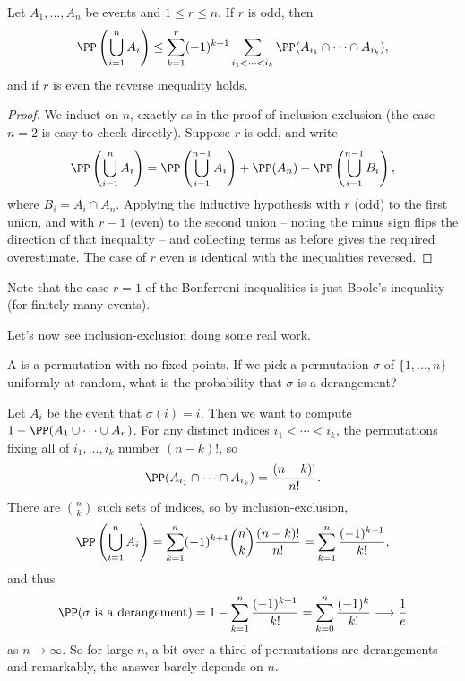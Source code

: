 \begin{theorem}
	Let $A_1, \dots, A_n$ be events and $1 \leq r \leq n$. If $r$ is odd, then
	$$
	\PP\left(\bigcup_{i = 1}^n A_i\right) \leq \sum_{k = 1}^{r} (-1)^{k + 1} \sum_{i_1 < \cdots < i_k} \PP(A_{i_1} \cap \cdots \cap A_{i_k}),
	$$
	and if $r$ is even the reverse inequality holds.
\end{theorem}
\begin{proof}
	We induct on $n$, exactly as in the proof of inclusion-exclusion (the case $n = 2$ is easy to check directly). Suppose $r$ is odd, and write
	$$
	\PP\left(\bigcup_{i = 1}^{n} A_i\right) = \PP\left(\bigcup_{i = 1}^{n-1} A_i\right) + \PP(A_n) - \PP\left(\bigcup_{i = 1}^{n - 1} B_i\right),
	$$
	where $B_i = A_i \cap A_n$. Applying the inductive hypothesis with $r$ (odd) to the first union, and with $r - 1$ (even) to the second union -- noting the minus sign flips the direction of that inequality -- and collecting terms as before gives the required overestimate. The case of $r$ even is identical with the inequalities reversed.
\end{proof}

Note that the case $r = 1$ of the Bonferroni inequalities is just Boole's inequality (for finitely many events).

Let's now see inclusion-exclusion doing some real work.

\begin{example}[Derangements]
	A  is a permutation with no fixed points. If we pick a permutation $\sigma$ of $\{1, \dots, n\}$ uniformly at random, what is the probability that $\sigma$ is a derangement?

	Let $A_i$ be the event that $\sigma(i) = i$. Then we want to compute $1 - \PP(A_1 \cup \cdots \cup A_n)$. For any distinct indices $i_1 < \cdots < i_k$, the permutations fixing all of $i_1, \dots, i_k$ number $(n - k)!$, so
	$$
	\PP(A_{i_1} \cap \cdots \cap A_{i_k}) = \frac{(n-k)!}{n!}.
	$$
	There are $\binom{n}{k}$ such sets of indices, so by inclusion-exclusion,
	$$
	\PP\left(\bigcup_{i = 1}^{n} A_i\right) = \sum_{k = 1}^{n} (-1)^{k+1} \binom{n}{k} \frac{(n - k)!}{n!} = \sum_{k = 1}^{n} \frac{(-1)^{k + 1}}{k!},
	$$
	and thus
	$$
	\PP(\sigma \text{ is a derangement}) = 1 - \sum_{k = 1}^{n} \frac{(-1)^{k+1}}{k!} = \sum_{k = 0}^{n} \frac{(-1)^k}{k!} \longrightarrow \frac{1}{e}
	$$
	as $n \rightarrow \infty$. So for large $n$, a bit over a third of permutations are derangements -- and remarkably, the answer barely depends on $n$.
\end{example}

